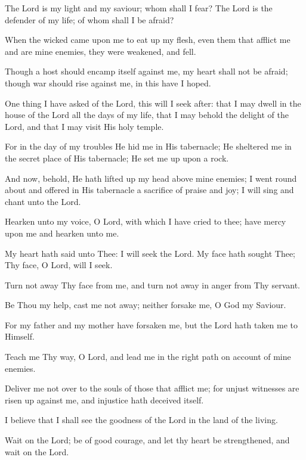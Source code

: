 The Lord is my light and my saviour; whom shall I fear? The Lord is the defender of my life; of whom shall I be afraid?

When the wicked came upon me to eat up my flesh, even them that afflict me and are mine enemies, they were weakened, and fell.

Though a host should encamp itself against me, my heart shall not be afraid; though war should rise against me, in this have I hoped.

One thing I have asked of the Lord, this will I seek after: that I may dwell in the house of the Lord all the days of my life, that I may behold the delight of the Lord, and that I may visit His holy temple.

For in the day of my troubles He hid me in His tabernacle; He sheltered me in the secret place of His tabernacle; He set me up upon a rock.

And now, behold, He hath lifted up my head above mine enemies; I went round about and offered in His tabernacle a sacrifice of praise and joy; I will sing and chant unto the Lord.

Hearken unto my voice, O Lord, with which I have cried to thee; have mercy upon me and hearken unto me.

My heart hath said unto Thee: I will seek the Lord. My face hath sought Thee; Thy face, O Lord, will I seek.

Turn not away Thy face from me, and turn not away in anger from Thy servant.

Be Thou my help, cast me not away; neither forsake me, O God my Saviour.

For my father and my mother have forsaken me, but the Lord hath taken me to Himself.

Teach me Thy way, O Lord, and lead me in the right path on account of mine enemies.

Deliver me not over to the souls of those that afflict me; for unjust witnesses are risen up against me, and injustice hath deceived itself.

I believe that I shall see the goodness of the Lord in the land of the living.

Wait on the Lord; be of good courage, and let thy heart be strengthened, and wait on the Lord.
